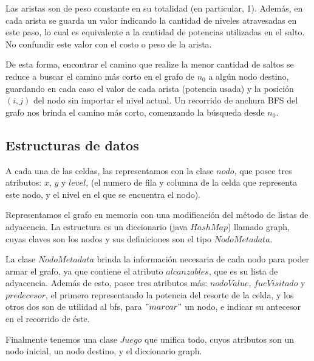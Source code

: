 \vspace{2mm}

Las aristas son de peso constante en su totalidad (en particular, 1). Adem\'as, en cada arista se guarda un valor indicando la cantidad de niveles atravesadas en este paso, lo cual es equivalente a la cantidad de potencias utilizadas en el salto. No confundir este valor con el costo o peso de la arista.
\vspace{2mm}


De esta forma, encontrar el camino que realize la menor cantidad de saltos se reduce a buscar el camino m\'as corto en el grafo de $n_0$ a alg\'un nodo destino, guardando en cada caso el valor de cada arista (potencia usada) y la posici\'on $(i,j)$ del nodo sin importar el nivel actual. Un recorrido de anchura BFS del grafo nos brinda el camino m\'as corto, comenzando la b\'usqueda desde $n_0$.

\subsection{Estructuras de datos}

A cada una de las celdas, las representamos con la clase $nodo$, que posee tres atributos: $x$, $y$ y $level$, (el numero de fila y columna de la celda que representa este nodo, y el nivel en el que se encuentra el nodo).

\vspace{2mm}

Representamos el grafo en memoria con una modificaci\'on del m\'etodo de listas de adyacencia. La estructura es un diccionario (java $HashMap$) llamado graph, cuyas claves son los nodos y sus definiciones son el tipo $NodoMetadata$.

\vspace{2mm}

La clase $NodoMetadata$ brinda la informaci\'on necesaria de cada nodo para poder armar el grafo, ya que contiene el atributo $alcanzables$, que es su lista de adyacencia. Adem\'as de esto, posee tres atributos m\'as: $nodoValue$, $fueVisitado$ y $predecesor$, el primero representando la potencia del resorte de la celda, y los otros dos son de utilidad al bfs, para $"marcar"$ un nodo, e indicar su antecesor en el recorrido de \'este.

\vspace{2mm}

Finalmente tenemos una clase $Juego$ que unifica todo, cuyos atributos son un nodo inicial, un nodo destino, y el diccionario graph.



